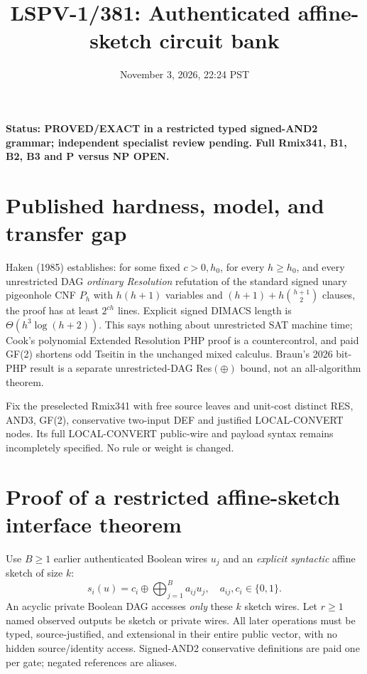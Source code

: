\documentclass{article}
\title{LSPV-1/381: Authenticated affine-sketch circuit bank}
\date{November 3, 2026, 22:24 PST}
\begin{document}
\maketitle
\noindent\textbf{Status: PROVED/EXACT in a restricted typed signed-AND2 grammar; independent specialist review pending. Full Rmix341, B1, B2, B3 and P versus NP OPEN.}

\section*{Published hardness, model, and transfer gap}
Haken (1985) establishes: for some fixed $c>0,h_0$, for every $h\ge h_0$, and every unrestricted DAG \emph{ordinary Resolution} refutation of the standard signed unary pigeonhole CNF $P_h$ with $h(h+1)$ variables and $(h+1)+h\binom{h+1}{2}$ clauses, the proof has at least $2^{ch}$ lines. Explicit signed DIMACS length is $\Theta(h^3\log(h+2))$. This says nothing about unrestricted SAT machine time; Cook's polynomial Extended Resolution PHP proof is a countercontrol, and paid GF(2) shortens odd Tseitin in the unchanged mixed calculus. Braun's 2026 bit-PHP result is a separate unrestricted-DAG Res$(\oplus)$ bound, not an all-algorithm theorem.

Fix the preselected Rmix341 with free source leaves and unit-cost distinct RES, AND3, GF(2), conservative two-input DEF and justified LOCAL-CONVERT nodes. Its full LOCAL-CONVERT public-wire and payload syntax remains incompletely specified. No rule or weight is changed.

\section*{Proof of a restricted affine-sketch interface theorem}
Use $B\ge1$ earlier authenticated Boolean wires $u_j$ and an \emph{explicit syntactic} affine sketch of size $k$:
\[
s_i(u)=c_i\oplus\bigoplus_{j=1}^{B}a_{ij}u_j,\quad a_{ij},c_i\in\{0,1\}.
\]
An acyclic private Boolean DAG accesses \emph{only} these $k$ sketch wires. Let $r\ge1$ named observed outputs be sketch or private wires. All later operations must be typed, source-justified, and extensional in their entire public vector, with no hidden source/identity access. Signed-AND2 conservative definitions are paid one per gate; negated references are aliases.
\end{document}
